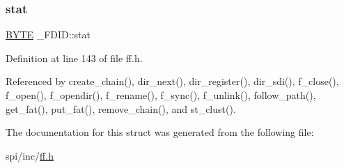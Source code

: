 \subsubsection{\texorpdfstring{stat}{stat}}
{\footnotesize\ttfamily \hyperlink{lz4_8c_a4ae1dab0fb4b072a66584546209e7d58}{B\+Y\+TE} \+\_\+\+F\+D\+I\+D\+::stat}



Definition at line 143 of file ff.\+h.



Referenced by create\+\_\+chain(), dir\+\_\+next(), dir\+\_\+register(), dir\+\_\+sdi(), f\+\_\+close(), f\+\_\+open(), f\+\_\+opendir(), f\+\_\+rename(), f\+\_\+sync(), f\+\_\+unlink(), follow\+\_\+path(), get\+\_\+fat(), put\+\_\+fat(), remove\+\_\+chain(), and st\+\_\+clust().



The documentation for this struct was generated from the following file\+:\begin{DoxyCompactItemize}
\item 
spi/inc/\hyperlink{ff_8h}{ff.\+h}\end{DoxyCompactItemize}
